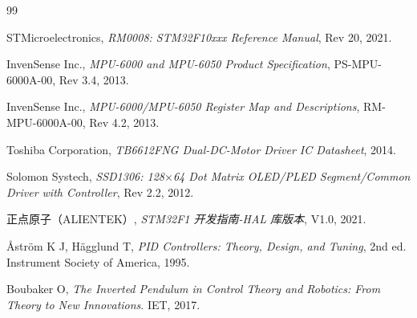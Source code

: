 \documentclass[12pt,a4paper,UTF8]{ctexrep}
\begin{document}
\begin{thebibliography}{99}

STMicroelectronics, \textit{RM0008: STM32F10xxx Reference Manual}, Rev 20, 2021.

InvenSense Inc., \textit{MPU-6000 and MPU-6050 Product Specification}, PS-MPU-6000A-00, Rev 3.4, 2013.

InvenSense Inc., \textit{MPU-6000/MPU-6050 Register Map and Descriptions}, RM-MPU-6000A-00, Rev 4.2, 2013.

Toshiba Corporation, \textit{TB6612FNG Dual-DC-Motor Driver IC Datasheet}, 2014.

Solomon Systech, \textit{SSD1306: 128$\times$64 Dot Matrix OLED/PLED Segment/Common Driver with Controller}, Rev 2.2, 2012.

正点原子（ALIENTEK）, \textit{STM32F1 开发指南-HAL 库版本}, V1.0, 2021.

\AA{}str\"{o}m K J, H\"{a}gglund T, \textit{PID Controllers: Theory, Design, and Tuning}, 2nd ed. Instrument Society of America, 1995.

Boubaker O, \textit{The Inverted Pendulum in Control Theory and Robotics: From Theory to New Innovations}. IET, 2017.

\end{thebibliography}
\end{document}
